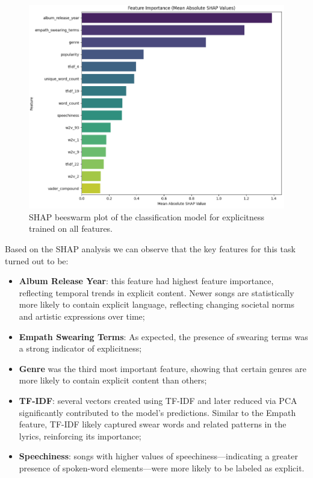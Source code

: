 \begin{center}
\begin{figure}[H]
  \centering
  \includegraphics[width=5in]{img/feature_importance_explicitness.png}
  \caption{SHAP beeswarm plot of the classification model for explicitness  trained on all features.}
  \label{Figure:fig_beh}
\end{figure}
\end{center}


Based on the SHAP analysis we can observe that the key features for this task
turned out to be:
\begin{itemize}
  \item \textbf{Album Release Year}: this feature had  highest feature
    importance, reflecting temporal trends in explicit content. Newer songs are
    statistically more likely to contain explicit language, reflecting changing
    societal norms and artistic expressions over time;
  \item \textbf{Empath Swearing Terms}: As expected, the presence of swearing
    terms was a strong indicator of explicitness;
  \item \textbf{Genre} was the third most important feature, showing that
    certain genres  are more likely to contain explicit content than others;
  \item \textbf{TF-IDF}: several vectors created using TF-IDF and later reduced
    via PCA significantly contributed to the model's predictions. Similar to
    the Empath feature, TF-IDF likely captured swear words and related patterns
    in the lyrics, reinforcing its importance;
  \item \textbf{Speechiness}: songs with higher values of
    speechiness—indicating a greater presence of spoken-word elements—were more
    likely to be labeled as explicit.
\end{itemize}




